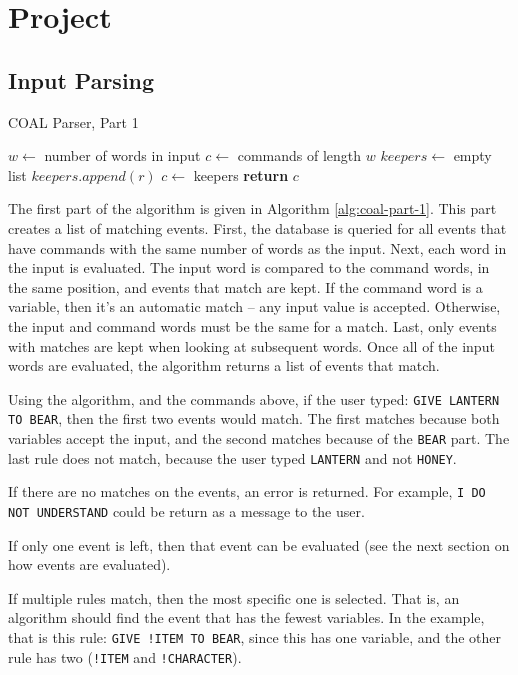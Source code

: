\documentclass{article}
\newcommand{\enterProblemHeader}[1]{
}
\newcommand{\exitProblemHeader}[1]{
\nobreak\extramarks{#1}{}\nobreak
}
\newcounter{homeworkProblemCounter} %
\newcommand{\homeworkProblemName}{}
\newenvironment{homeworkProblem}[1][Problem \arabic{homeworkProblemCounter}]{ %
\stepcounter{homeworkProblemCounter} %
\renewcommand{\homeworkProblemName}{#1} %
\section{\homeworkProblemName} %
\enterProblemHeader{\homeworkProblemName} %
}{
\exitProblemHeader{\homeworkProblemName} %
}
\newcommand{\homeworkSectionName}{}
\newenvironment{homeworkSection}[1]{ %
\renewcommand{\homeworkSectionName}{#1} %
\subsection{\homeworkSectionName} %
\enterProblemHeader{\homeworkProblemName\ [\homeworkSectionName]} %
}{
\enterProblemHeader{\homeworkProblemName} %
}
\begin{document}
\begin{homeworkProblem}[Project]
\begin{homeworkSection}{Input Parsing}
	\begin{algorithm}
		\caption{COAL Parser, Part 1}
		\label{alg:coal-part-1}
		\begin{algorithmic}
				\State $w \gets$ number of words in input
				\State $c \gets$ commands of length $w$
					\State $keepers \gets$ empty list
							\State $keepers.append(r)$
						\EndIf
					\EndFor
					\State $c \gets$ keepers
				\EndFor
				\State \textbf{return} $c$
			\EndProcedure
	\end{algorithmic}
	\end{algorithm}

	The first part of the algorithm is given in Algorithm \ref{alg:coal-part-1}. This part creates a list of matching events. First, the database is queried for all events that have commands with the same number of words as the input. Next, each word in the input is evaluated. The input word is compared to the command words, in the same position, and events that match are kept. If the command word is a variable, then it's an automatic match -- any input value is accepted. Otherwise, the input and command words must be the same for a match. Last, only events with matches are kept when looking at subsequent words. Once all of the input words are evaluated, the algorithm returns a list of events that match.
	
	Using the algorithm, and the commands above, if the user typed: \texttt{GIVE LANTERN TO BEAR}, then the first two events would match. The first matches because both variables accept the input, and the second matches because of the \texttt{BEAR} part. The last rule does not match, because the user typed \texttt{LANTERN} and not \texttt{HONEY}.

	If there are no matches on the events, an error is returned. For example, \texttt{I DO NOT UNDERSTAND} could be return as a message to the user.

	If only one event is left, then that event can be evaluated (see the next section on how events are evaluated).

	If multiple rules match, then the most specific one is selected. That is, an algorithm should find the event that has the fewest variables. In the example, that is this rule: \texttt{GIVE !ITEM TO BEAR}, since this has one variable, and the other rule has two (\texttt{!ITEM} and \texttt{!CHARACTER}).


\end{homeworkSection}
\end{homeworkProblem}
\end{document}
